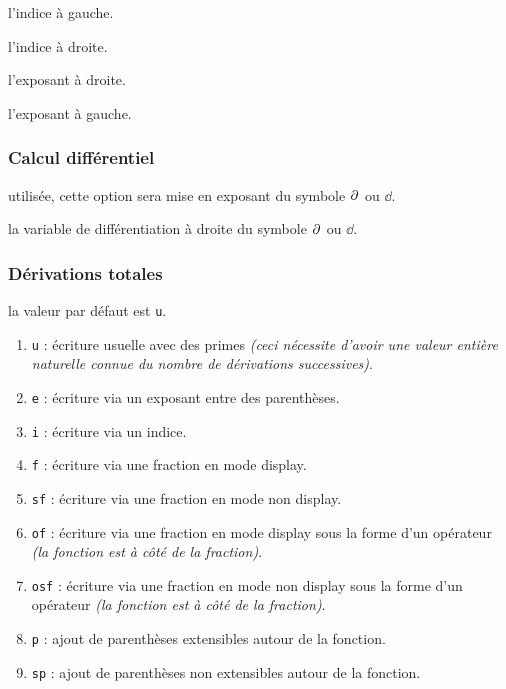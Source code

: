 \documentclass[12pt,a4paper]{article}
\theoremstyle{definition}
\begin{document}
 l'indice à gauche.

 l'indice à droite.

 l'exposant à droite.

 l'exposant à gauche.
\subsubsection{Calcul différentiel}



\IDoption{} utilisée, cette option sera mise en exposant du symbole $\pp{}$ ou $\dd{}$.

\IDarg{} la variable de différentiation à droite du symbole $\pp{}$ ou $\dd{}$.





\subsubsection{Dérivations totales}


\IDoption{} la valeur par défaut est \verb+u+. 
\begin{enumerate}
	\item \verb+u+ : écriture usuelle avec des primes \emph{(ceci nécessite d'avoir une valeur entière naturelle connue du nombre de dérivations successives)}.

	\item \verb+e+ : écriture via un exposant entre des parenthèses.
	
	\item \verb+i+ : écriture via un indice.

	\item \verb+f+ : écriture via une fraction en mode display.

	\item \verb+sf+ : écriture via une fraction en mode non display.

	\item \verb+of+ : écriture via une fraction en mode display sous la forme d'un opérateur \emph{(la fonction est à côté de la fraction)}.

	\item \verb+osf+ : écriture via une fraction en mode non display sous la forme d'un opérateur \emph{(la fonction est à côté de la fraction)}.

	\smallskip
	\item \verb+p+ : ajout de parenthèses extensibles autour de la fonction.

	\item \verb+sp+ : ajout de parenthèses non extensibles autour de la fonction.
\end{enumerate}
\end{document}
